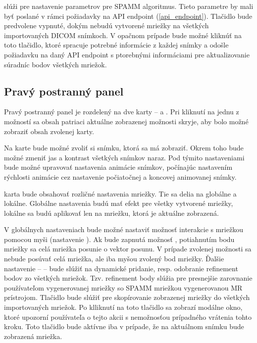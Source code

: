  slúži pre nastavenie parametrov pre SPAMM algoritmus. Tieto parametre by mali byť poslané v rámci požiadavky na API endpoint (\ref{api_endpoint}). Tlačidlo  bude predvolene vypnuté, dokým nebudú vytvorené mriežky na všetkých importovaných DICOM snímkoch. V opačnom prípade bude možné kliknúť na toto tlačidlo, ktoré spracuje potrebné informácie z každej snímky a odošle požiadavku na daný API endpoint s ptorebnými informáciami pre aktualizovanie súradníc bodov všetkých mriežok.

\subsection {Pravý postranný panel}
Pravý postranný panel je rozdelený na dve karty --  a . Pri kliknutí na jednu z možností sa obsah patriaci aktuálne zobrazenej možnosti skryje, aby bolo možné zobraziť obsah zvolenej karty.

Na  karte bude možné zvoliť si snímku, ktorá sa má zobraziť. Okrem toho bude možné zmeniť jas a kontrast všetkých snímkov naraz. Pod týmito nastaveniami bude možné upravovať nastavenia animácie snímkov, počínajúc nastavením rýchlosti animácie cez nastavenie počiatočnej a koncovej animovanej snímky.

 karta bude obsahovať rozličné nastavenia mriežky. Tie sa delia na globálne a lokálne. Globálne nastavenia budú mať efekt pre všetky vytvorené mriežky, lokálne sa budú aplikovať len na mriežku, ktorá je aktuálne zobrazená.

V globálnych nastaveniach bude možné nastaviť možnosť interakcie s mriežkou pomocou myši (nastavenie ). Ak bude zapnutá možnosť , potiahnutím bodu mriežky sa celá mriežka posunie o vektor posunu. V prípade zvolenej možnosti  sa nebude posúvať celá mriežka, ale iba myšou zvolený bod mriežky.
Ďalšie nastavenie --  -- bude slúžiť na dynamické pridanie, resp. odobranie refinement bodov zo všetkých mriežok. Tzv. refinement body slúžia pre presnejšie zarovnanie používateľom vygenerovanej mriežky so SPAMM mriežkou vygenerovanou MR prístrojom.
Tlačidlo  bude slúžiť pre skopírovanie zobrazenej mriežky do všetkých importovaných mriežok. Po klliknutí na toto tlačidlo sa zobrazí modálne okno, ktoré upozorní používateľa o tejto akcii s nemožnosťou prípadného vrátenia tohto kroku. Toto tlačidlo bude aktívne iba v prípade, že na aktuálnom snímku bude zobrazená mriežka.

